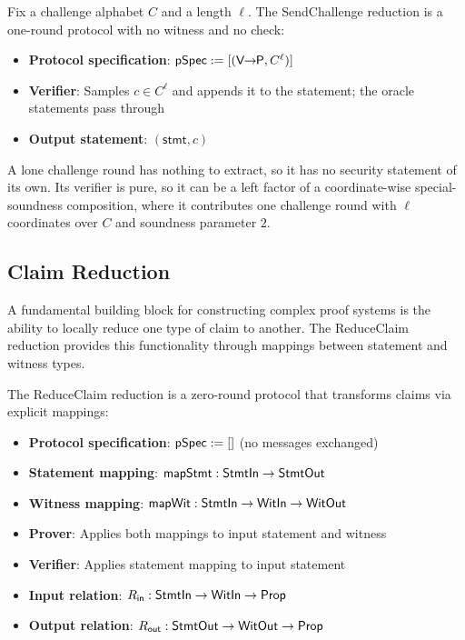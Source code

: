\begin{definition}
    \label{def:sendchallenge_oracle_reduction}
    Fix a challenge alphabet $C$ and a length $\ell$. The SendChallenge reduction is a one-round protocol with no witness and no check:
    \begin{itemize}
        \item \textbf{Protocol specification}: $\mathsf{pSpec} := [(\mathsf{V \!\!\rightarrow\!\! P}, C^{\ell})]$
        \item \textbf{Verifier}: Samples $c \in C^{\ell}$ and appends it to the statement; the oracle statements pass through
        \item \textbf{Output statement}: $(\mathsf{stmt}, c)$
    \end{itemize}
    A lone challenge round has nothing to extract, so it has no security statement of its own. Its verifier is pure, so it can be a left factor of a coordinate-wise special-soundness composition, where it contributes one challenge round with $\ell$ coordinates over $C$ and soundness parameter $2$.
    \leanok
\end{definition}

\subsection{Claim Reduction}

A fundamental building block for constructing complex proof systems is the ability to locally reduce one type of claim to another. The ReduceClaim reduction provides this functionality through mappings between statement and witness types.

\begin{definition}
    \label{def:reduceclaim_reduction}
    The ReduceClaim reduction is a zero-round protocol that transforms claims via explicit mappings:
    \begin{itemize}
        \item \textbf{Protocol specification}: $\mathsf{pSpec} := []$ (no messages exchanged)
        \item \textbf{Statement mapping}: $\mathsf{mapStmt} : \mathsf{StmtIn} \to \mathsf{StmtOut}$
        \item \textbf{Witness mapping}: $\mathsf{mapWit} : \mathsf{StmtIn} \to \mathsf{WitIn} \to \mathsf{WitOut}$
        \item \textbf{Prover}: Applies both mappings to input statement and witness
        \item \textbf{Verifier}: Applies statement mapping to input statement
        \item \textbf{Input relation}: $R_{\mathsf{in}} : \mathsf{StmtIn} \to \mathsf{WitIn} \to \mathsf{Prop}$
        \item \textbf{Output relation}: $R_{\mathsf{out}} : \mathsf{StmtOut} \to \mathsf{WitOut} \to \mathsf{Prop}$
    \end{itemize}
    \leanok
\end{definition}

